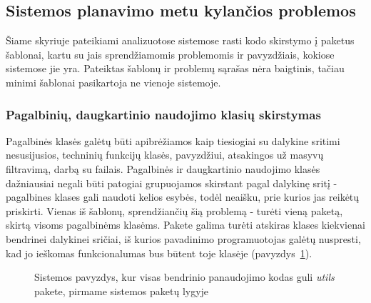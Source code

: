 \subsection{Sistemos planavimo metu kylančios problemos}
Šiame skyriuje pateikiami analizuotose sistemose rasti kodo skirstymo į paketus šablonai, kartu su jais sprendžiamomis problemomis ir pavyzdžiais,
kokiose sistemose jie yra.
Pateiktas šablonų ir problemų sąrašas nėra baigtinis, tačiau minimi šablonai pasikartoja ne vienoje sistemoje.

\subsubsection{Pagalbinių, daugkartinio naudojimo klasių skirstymas}
Pagalbinės klasės galėtų būti apibrėžiamos kaip tiesiogiai su dalykine sritimi nesusijusios, techninių funkcijų klasės,
pavyzdžiui, atsakingos už masyvų filtravimą, darbą su failais.
Pagalbinės ir daugkartinio naudojimo klasės dažniausiai negali būti patogiai grupuojamos skirstant pagal dalykinę sritį - pagalbines klases gali
naudoti kelios esybės, todėl neaišku, prie kurios jas reikėtų priskirti.
Vienas iš šablonų, sprendžiančių šią problemą - turėti vieną paketą, skirtą visoms pagalbinėms klasėms.
Pakete galima turėti atskiras klases kiekvienai bendrinei dalykinei sričiai, iš kurios pavadinimo programuotojas galėtų nuspresti,
kad jo ieškomas funkcionalumas bus būtent toje klasėje (pavyzdys~\ref{fig:utils}).
\begin{figure}[H]
\snugshade
{}
\endsnugshade
\caption{Sistemos pavyzdys, kur visas bendrinio panaudojimo kodas guli \textit{utils} pakete, pirmame sistemos paketų lygyje}
\label{fig:utils}
\end{figure}

